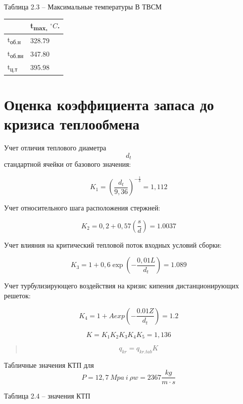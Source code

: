 Таблица 2.3 -- Максимальные температуры В ТВСМ

\begin{longtable}[]{@{}|l|l|@{}} 
\toprule
& t\textsubscript{max,} $^\circ C$.\tabularnewline
\midrule
\endhead
t\textsubscript{об.н} & 328.79\tabularnewline
t\textsubscript{об.вн} & 347.80\tabularnewline
t\textsubscript{ц.т} & 395.98\tabularnewline
\bottomrule
\end{longtable}

\clearpage

\section{Оценка коэффициента запаса до кризиса теплообмена}

Учет отличия теплового диаметра \[d_{t}\] стандартной ячейки от базового
значения:

\begin{equation}
K_{1} = \left( \frac{d_{t}}{9,36} \right)^{- \frac{1}{3}} = 1,112
\end{equation}


Учет относительного шага расположения стержней:

\begin{equation}
K_{2} = 0,2 + 0,57\left( \frac{s}{d} \right) = 1.0037
\end{equation}


Учет влияния на критический тепловой поток входных условий сборки:

\begin{equation}
K_{3} = 1 + 0,6\exp{\left( - \frac{0,01L}{d_{t}} \right) = 1.089}
\end{equation}


Учет турбулизирующего воздействия на кризис кипения дистанционирующих
решеток:

\begin{equation}
K_{4} = 1 + Aexp\left( - \frac{0.01Z}{d_{t}} \right) = 1.2
\end{equation}

\begin{equation}
K = K_{1}K_{2}K_{3}K_{4}K_{5} = 1,136
\end{equation}

\begin{quote}
\[q_{kr} = q_{kr.tab}K\]
\end{quote}


Табличные значения КТП для
\[P = 12,7\ Mpa\ i\ \rho w = 2367\frac{kg}{m \cdot s}\]

Таблица 2.4 -- значения КТП

